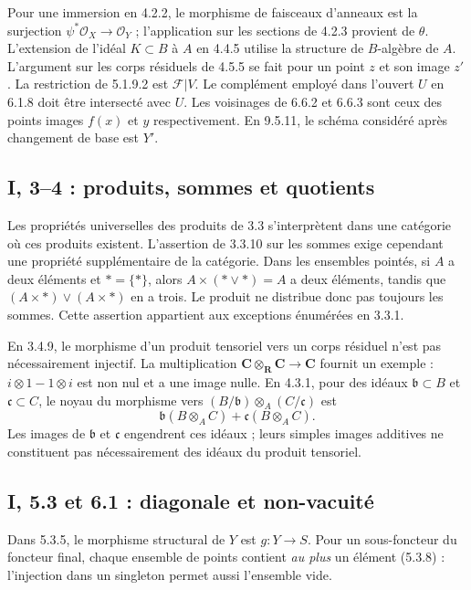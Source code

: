 \documentclass[11pt,a4paper]{article}
\begin{document}
Pour une immersion en 4.2.2, le morphisme de faisceaux d'anneaux est
la surjection $\psi^*\mathcal O_X\to\mathcal O_Y$ ; l'application sur
les sections de 4.2.3 provient de $\theta$.
L'extension de l'idéal $K\subset B$ à $A$ en 4.4.5 utilise la structure
de $B$-algèbre de $A$. L'argument sur les corps résiduels de 4.5.5
se fait pour un point $z$ et son image $z'$.
La restriction de 5.1.9.2 est $\mathcal F|V$.
Le complément employé dans l'ouvert $U$ en 6.1.8 doit être intersecté
avec $U$. Les voisinages de 6.6.2 et 6.6.3 sont ceux des points images
$f(x)$ et $y$ respectivement. En 9.5.11, le schéma considéré après
changement de base est $Y'$.

\subsection{I, 3--4 : produits, sommes et quotients}
\label{note:base1-categorical}
Les propriétés universelles des produits de 3.3 s'interprètent dans
une catégorie où ces produits existent. L'assertion de 3.3.10 sur
les sommes exige cependant une propriété supplémentaire de la
catégorie. Dans les ensembles pointés, si $A$ a deux éléments et
$*=\{*\}$, alors $A\times(*\vee*)=A$ a deux éléments, tandis que
$(A\times*)\vee(A\times*)$ en a trois. Le produit ne distribue
donc pas toujours les sommes. Cette assertion appartient aux
exceptions énumérées en 3.3.1.

En 3.4.9, le morphisme d'un produit tensoriel vers un corps résiduel
n'est pas nécessairement injectif. La multiplication
$\mathbf C\otimes_{\mathbf R}\mathbf C\to\mathbf C$ fournit
un exemple : $i\otimes1-1\otimes i$ est non nul et a une image nulle.
En 4.3.1, pour des idéaux $\mathfrak b\subset B$ et
$\mathfrak c\subset C$, le noyau du morphisme vers
$(B/\mathfrak b)\otimes_A(C/\mathfrak c)$ est
\[
 \mathfrak b(B\otimes_A C)+\mathfrak c(B\otimes_A C).
\]
Les images de $\mathfrak b$ et $\mathfrak c$ engendrent ces idéaux ;
leurs simples images additives ne constituent pas nécessairement
des idéaux du produit tensoriel.

\subsection{I, 5.3 et 6.1 : diagonale et non-vacuité}
\label{note:base1-diagonal}
Dans 5.3.5, le morphisme structural de $Y$ est $g:Y\to S$.
Pour un sous-foncteur du foncteur final, chaque ensemble de points
contient \emph{au plus} un élément (5.3.8) : l'injection dans un
singleton permet aussi l'ensemble vide.
\end{document}
